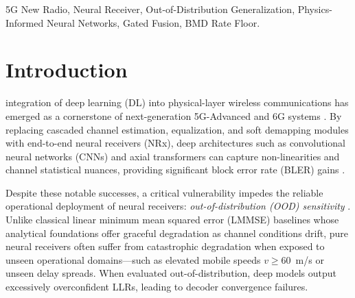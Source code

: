 \documentclass[journal,10pt,twocolumn]{IEEEtran}
\theoremstyle{definition}
\begin{document}
\begin{IEEEkeywords}
5G New Radio, Neural Receiver, Out-of-Distribution Generalization, Physics-Informed Neural Networks, Gated Fusion, BMD Rate Floor.
\end{IEEEkeywords}

\section{Introduction}
 integration of deep learning (DL) into physical-layer wireless communications has emerged as a cornerstone of next-generation 5G-Advanced and 6G systems \cite{hoydis2021sionna}. By replacing cascaded channel estimation, equalization, and soft demapping modules with end-to-end neural receivers (NRx), deep architectures such as convolutional neural networks (CNNs) and axial transformers can capture non-linearities and channel statistical nuances, providing significant block error rate (BLER) gains \cite{cammerer2020trainable}.

Despite these notable successes, a critical vulnerability impedes the reliable operational deployment of neural receivers: \textit{out-of-distribution (OOD) sensitivity} \cite{pratik2021robust}. Unlike classical linear minimum mean squared error (LMMSE) baselines whose analytical foundations offer graceful degradation as channel conditions drift, pure neural receivers often suffer from catastrophic degradation when exposed to unseen operational domains---such as elevated mobile speeds $v \ge 60$~m/s or unseen delay spreads. When evaluated out-of-distribution, deep models output excessively overconfident LLRs, leading to decoder convergence failures.
\end{document}
